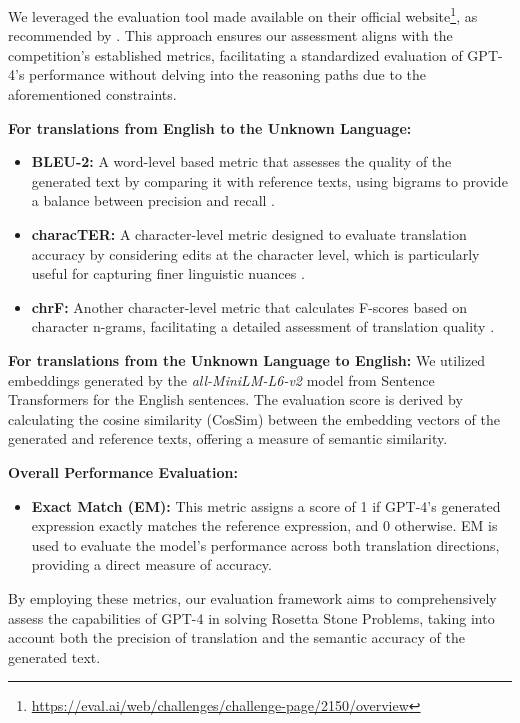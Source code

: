 \documentclass[10pt, a4paper]{article}
\begin{document}
We leveraged the evaluation tool made available on their official website\footnote{\url{https://eval.ai/web/challenges/challenge-page/2150/overview}}, as recommended by \citet{Puzz_Machine}. This approach ensures our assessment aligns with the competition's established metrics, facilitating a standardized evaluation of GPT-4's performance without delving into the reasoning paths due to the aforementioned constraints.

\textbf{For translations from English to the Unknown Language:}
\begin{itemize}
    \item \textbf{BLEU-2:} A word-level based metric that assesses the quality of the generated text by comparing it with reference texts, using bigrams to provide a balance between precision and recall \citep{bleu}.
    \item \textbf{characTER:} A character-level metric designed to evaluate translation accuracy by considering edits at the character level, which is particularly useful for capturing finer linguistic nuances \citep{characTer}.
    \item \textbf{chrF:} Another character-level metric that calculates F-scores based on character n-grams, facilitating a detailed assessment of translation quality \citep{chrf}.
\end{itemize}

\textbf{For translations from the Unknown Language to English:}
We utilized embeddings generated by the \textit{all-MiniLM-L6-v2} model from Sentence Transformers \citep{CosSim} for the English sentences. The evaluation score is derived by calculating the cosine similarity (CosSim) between the embedding vectors of the generated and reference texts, offering a measure of semantic similarity.

\textbf{Overall Performance Evaluation:}
\begin{itemize}
    \item \textbf{Exact Match (EM):} This metric assigns a score of 1 if GPT-4's generated expression exactly matches the reference expression, and 0 otherwise. EM is used to evaluate the model's performance across both translation directions, providing a direct measure of accuracy.
\end{itemize}

By employing these metrics, our evaluation framework aims to comprehensively assess the capabilities of GPT-4 in solving Rosetta Stone Problems, taking into account both the precision of translation and the semantic accuracy of the generated text.
\end{document}
